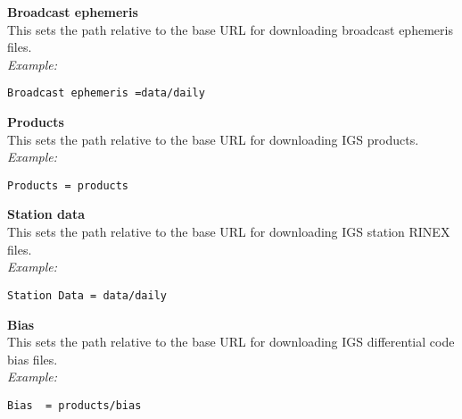 {\bfseries Broadcast ephemeris}\\
This sets the path relative to the base URL for downloading broadcast ephemeris files.\\
\textit{Example:}
\begin{lstlisting}
Broadcast ephemeris =data/daily
\end{lstlisting}

{\bfseries Products}\\
This sets the path relative to the base URL for downloading IGS products.\\
\textit{Example:}
\begin{lstlisting}
Products = products
\end{lstlisting}

{\bfseries Station data}\\
This sets the path relative to the base URL for downloading IGS station RINEX files. \\
\textit{Example:}
\begin{lstlisting}
Station Data = data/daily
\end{lstlisting}

{\bfseries Bias}\\
This sets the path relative to the base URL for downloading IGS differential code bias files. \\
\textit{Example:}
\begin{lstlisting}
Bias  = products/bias
\end{lstlisting}
